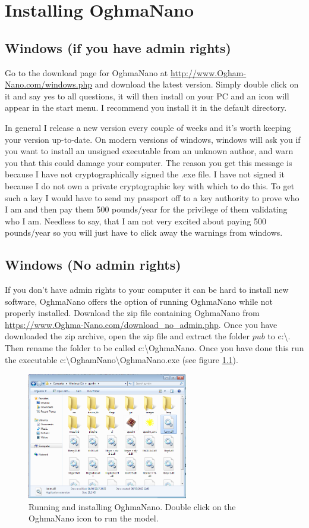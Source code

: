 \chapter{Installing OghmaNano}

\section{Windows (if you have admin rights)}
Go to the download page for OghmaNano at \url{http://www.Ogham-Nano.com/windows.php} and download the latest version.  Simply double click on it and say yes to all questions, it will then install on your PC and an icon will appear in the start menu. I recommend you install it in the default directory.

In general I release a new version every couple of weeks and it's worth keeping your version up-to-date. On modern versions of windows, windows will ask you if you want to install an unsigned executable from an unknown author, and warn you that this could damage your computer.  The reason you get this message is because I have not cryptographically signed the .exe file. I have not signed it because I do not own a private cryptographic key with which to do this.  To get such a key I would have to send my passport off to a key authority to prove who I am and then pay them 500 pounds/year for the privilege of them validating who I am.  Needless to say, that I am not very excited about paying 500 pounds/year so you will just have to click away the warnings from windows.

\section{Windows (No admin rights)}
If you don't have admin rights to your computer it can be hard to install new software, OghmaNano offers the option of running OghmaNano while not properly installed.  Download the zip file containing OghmaNano from \url{https://www.Oghma-Nano.com/download_no_admin.php}.  Once you have downloaded the zip archive, open the zip file and extract the folder $pub$ to c:\textbackslash . Then rename the folder to be called c:\textbackslash OghmaNano.  Once you have done this run the executable c:\textbackslash OghamNano\textbackslash OghmaNano.exe (see figure \ref{fig:directory}).

\begin{figure}
\centering
\includegraphics[width=70mm]{./images/dir.png}
\caption{Running and installing OghmaNano.  Double click on the OghmaNano icon to run the model.}
\label{fig:directory}
\end{figure}

